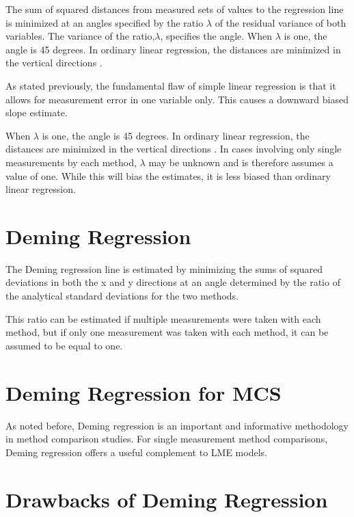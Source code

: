 \documentclass[12pt, a4paper]{report}
\theoremstyle{plain}
\theoremstyle{definition}
\theoremstyle{remark}
\begin{document}
The sum of squared distances from measured sets of values to the regression line is minimized at an angles specified by the ratio $\lambda$ of the residual variance of both variables. The variance of the ratio,$\lambda$, specifies the angle.  When $\lambda$ is one, the angle is 45 degrees. In ordinary linear regression, the distances are minimized in the vertical directions \citep{linnet99}.

As stated previously, the fundamental flaw of simple linear regression is that it allows for measurement error in one variable only. This causes a downward biased slope estimate.




When $\lambda$ is one, the angle is 45 degrees. In ordinary linear regression, the distances are minimized in the vertical directions \citep{linnet99}.
In cases involving only single measurements by each method, $\lambda$ may be unknown and is therefore assumes a value of one. While this will bias the estimates, it is less biased than ordinary linear regression.


\section{Deming Regression}

The Deming regression line is estimated by minimizing the sums of squared deviations in both the x and y directions at an angle determined by the ratio of the analytical standard deviations for the two methods.

This ratio can be estimated if multiple measurements were taken with each method, but if only one measurement was taken with each method, it can be assumed to be equal to one.


\section{Deming Regression for MCS}
As noted before, Deming regression is an important and informative methodology in method comparison studies.
For single measurement method comparisons, Deming regression offers a useful complement to LME models.

\section{Drawbacks of Deming Regression}
\end{document}
